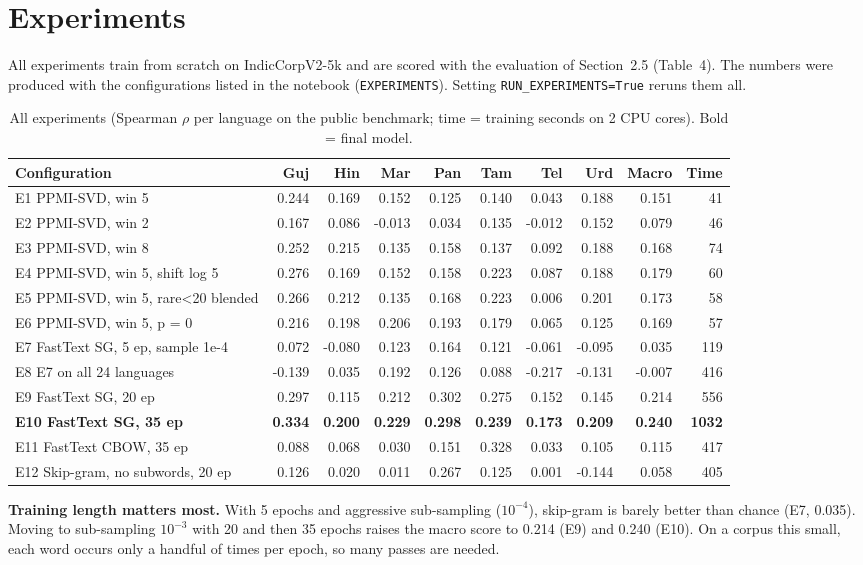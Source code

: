 \documentclass[11pt,a4paper]{article}
\begin{document}
\section{Experiments}
All experiments train from scratch on IndicCorpV2-5k and are scored with the evaluation of Section~2.5 (Table~4). The numbers were produced with the configurations listed in the notebook (\texttt{EXPERIMENTS}). Setting \texttt{RUN\_EXPERIMENTS=True} reruns them all.
\begin{table}[H]\centering\scriptsize\setlength{\tabcolsep}{3.5pt}
\caption{All experiments (Spearman $\rho$ per language on the public benchmark; time = training seconds on 2 CPU cores). Bold = final model.}
\begin{tabular}{lrrrrrrrrr}\toprule
Configuration & Guj & Hin & Mar & Pan & Tam & Tel & Urd & \textbf{Macro} & Time \\\midrule
E1 PPMI-SVD, win 5 & 0.244 & 0.169 & 0.152 & 0.125 & 0.140 & 0.043 & 0.188 & 0.151 & 41 \\
E2 PPMI-SVD, win 2 & 0.167 & 0.086 & -0.013 & 0.034 & 0.135 & -0.012 & 0.152 & 0.079 & 46 \\
E3 PPMI-SVD, win 8 & 0.252 & 0.215 & 0.135 & 0.158 & 0.137 & 0.092 & 0.188 & 0.168 & 74 \\
E4 PPMI-SVD, win 5, shift log 5 & 0.276 & 0.169 & 0.152 & 0.158 & 0.223 & 0.087 & 0.188 & 0.179 & 60 \\
E5 PPMI-SVD, win 5, rare<20 blended & 0.266 & 0.212 & 0.135 & 0.168 & 0.223 & 0.006 & 0.201 & 0.173 & 58 \\
E6 PPMI-SVD, win 5, p = 0 & 0.216 & 0.198 & 0.206 & 0.193 & 0.179 & 0.065 & 0.125 & 0.169 & 57 \\
E7 FastText SG, 5 ep, sample 1e-4 & 0.072 & -0.080 & 0.123 & 0.164 & 0.121 & -0.061 & -0.095 & 0.035 & 119 \\
E8 E7 on all 24 languages & -0.139 & 0.035 & 0.192 & 0.126 & 0.088 & -0.217 & -0.131 & -0.007 & 416 \\
E9 FastText SG, 20 ep & 0.297 & 0.115 & 0.212 & 0.302 & 0.275 & 0.152 & 0.145 & 0.214 & 556 \\
\textbf{E10 FastText SG, 35 ep} & \textbf{0.334} & \textbf{0.200} & \textbf{0.229} & \textbf{0.298} & \textbf{0.239} & \textbf{0.173} & \textbf{0.209} & \textbf{0.240} & \textbf{1032} \\
E11 FastText CBOW, 35 ep & 0.088 & 0.068 & 0.030 & 0.151 & 0.328 & 0.033 & 0.105 & 0.115 & 417 \\
E12 Skip-gram, no subwords, 20 ep & 0.126 & 0.020 & 0.011 & 0.267 & 0.125 & 0.001 & -0.144 & 0.058 & 405 \\
\bottomrule\end{tabular}\end{table}
\textbf{Training length matters most.} With 5 epochs and aggressive sub-sampling ($10^{-4}$), skip-gram is barely better than chance (E7, 0.035). Moving to sub-sampling $10^{-3}$ with 20 and then 35 epochs raises the macro score to 0.214 (E9) and 0.240 (E10). On a corpus this small, each word occurs only a handful of times per epoch, so many passes are needed.
\end{document}
